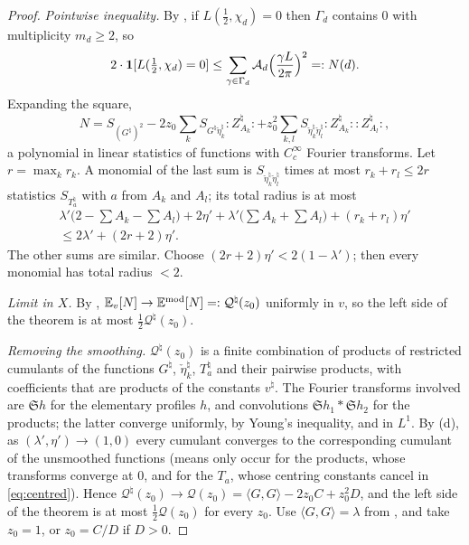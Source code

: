 \documentclass[11pt,colorlinks]{charlie}
\newcommand{\Wk}[1]{{:}#1{:}}
\begin{document}
\begin{proof}
\emph{Pointwise inequality.} By , if $L(\frac12,\chi_d)=0$ then $\Gamma_d$ contains $0$ with multiplicity $m_d\ge2$, so
\[
 2\cdot\mathbf{1}[L(\tfrac12,\chi_d)=0]\le\sum_{\gamma\in\Gamma_d}\mathcal A_d\Big(\frac{\gamma L}{2\pi}\Big)^2=:N(d).
\]
Expanding the square,
\[
 N=S_{(G^\natural)^2}-2z_0\sum_kS_{G^\natural\check\eta_k^\natural}\Wk{Z^\natural_{A_k}}+z_0^2\sum_{k,l}S_{\check\eta_k^\natural\check\eta_l^\natural}\Wk{Z^\natural_{A_k}}\Wk{Z^\natural_{A_l}},
\]
a polynomial in linear statistics of functions with $C_c^\infty$ Fourier transforms. Let $r=\max_kr_k$. A monomial of the last sum is $S_{\check\eta_k^\natural\check\eta_l^\natural}$ times at most $r_k+r_l\le2r$ statistics $S_{T_a^\natural}$ with $a$ from $A_k$ and $A_l$; its total radius is at most
\begin{multline*}
 \lambda'\Big(2-\sum A_k-\sum A_l\Big)+2\eta'+\lambda'\Big(\sum A_k+\sum A_l\Big)+(r_k+r_l)\eta'\\
 \le2\lambda'+(2r+2)\eta' .
\end{multline*}
The other sums are similar. Choose $(2r+2)\eta'<2(1-\lambda')$; then every monomial has total radius $<2$.

\emph{Limit in $X$.} By , $\mathbb{E}_v[N]\to\mathbb E^{\mathrm{mod}}[N]=:\mathcal Q^\natural(z_0)$ uniformly in $v$, so the left side of the theorem is at most $\frac12\mathcal Q^\natural(z_0)$.

\emph{Removing the smoothing.} $\mathcal Q^\natural(z_0)$ is a finite combination of products of restricted cumulants of the functions $G^\natural$, $\check\eta_k^\natural$, $T_a^\natural$ and their pairwise products, with coefficients that are products of the constants $v^\natural$. The Fourier transforms involved are $\mathfrak Sh$ for the elementary profiles $h$, and convolutions $\mathfrak Sh_1*\mathfrak Sh_2$ for the products; the latter converge uniformly, by Young's inequality, and in $L^1$. By (d), as $(\lambda',\eta')\to(1,0)$ every cumulant converges to the corresponding cumulant of the unsmoothed functions (means only occur for the products, whose transforms converge at $0$, and for the $T_a$, whose centring constants cancel in \eqref{eq:centred}). Hence $\mathcal Q^\natural(z_0)\to\mathcal Q(z_0)=\langle G,G\rangle-2z_0C+z_0^2D$, and the left side of the theorem is at most $\frac12\mathcal Q(z_0)$ for every $z_0$. Use $\langle G,G\rangle=\lambda$ from , and take $z_0=1$, or $z_0=C/D$ if $D>0$.
\end{proof}
\end{document}
